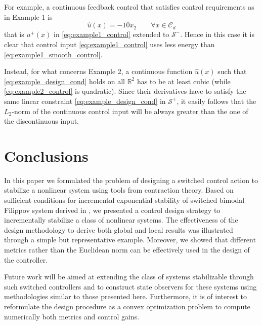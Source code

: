 \documentclass[letterpaper, 10 pt, conference]{ieeeconf}
\begin{document}
For example, a continuous feedback control that satisfies control requirements as in Example 1 is
\begin{equation}
\label{eq:example1_smooth_control}
\widehat{u}(x)=-10x_2 \qquad \forall x\in\mathcal{C}_d
\end{equation}
that is $u^+(x)$ in \eqref{eq:example1_control} extended to $\mathcal{S}^-$. Hence in this case it is clear that control input \eqref{eq:example1_control} uses less energy than \eqref{eq:example1_smooth_control}.

Instead, for what concerns Example 2, a continuous function $\widehat{u}(x)$ such that \eqref{eq:example_design_cond} holds on all $\mathbb{R}^2$ has to be at least cubic (while \eqref{eq:example2_control} is quadratic). Since their derivatives have to satisfy the same linear constraint \eqref{eq:example_design_cond} in $\mathcal{S}^+$, it easily follows that the $L_2$-norm of the continuous control input will be always greater than the one of the discontinuous input. 





\section{Conclusions}
\label{sec:conclusions}

In this paper we formulated the problem of designing a switched control action to stabilize a nonlinear system using tools from contraction theory. Based on sufficient conditions for incremental exponential stability of switched bimodal Filippov system derived in \cite{fiore2015contraction}, we presented a control design strategy to incrementally stabilize a class of nonlinear systems. The effectiveness of the design methodology to derive both global and local results was illustrated through a simple but representative example. Moreover, we showed that different metrics rather than the Euclidean norm can be effectively used in the design of the controller.

Future work will be aimed at extending the class of systems stabilizable through such switched controllers and to construct state observers for these systems using methodologies similar to those presented here. Furthermore, it is of interest to reformulate the design procedure as a convex optimization problem to compute numerically both metrics and control gains.






\addtolength{\textheight}{-9.5cm}   
\end{document}
